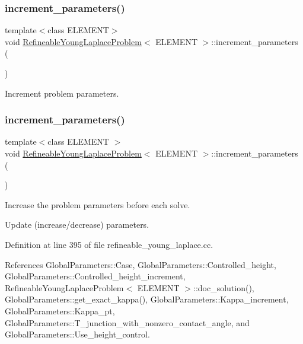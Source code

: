 \subsubsection{\texorpdfstring{increment\+\_\+parameters()}{increment\_parameters()}\hspace{0.1cm}{\footnotesize\ttfamily [1/2]}}
{\footnotesize\ttfamily template$<$class E\+L\+E\+M\+E\+NT$>$ \\
void \hyperlink{classRefineableYoungLaplaceProblem}{Refineable\+Young\+Laplace\+Problem}$<$ E\+L\+E\+M\+E\+NT $>$\+::increment\+\_\+parameters (\begin{DoxyParamCaption}{ }\end{DoxyParamCaption})}



Increment problem parameters. 

\mbox{\label{classRefineableYoungLaplaceProblem_ac8da9e38012994438200b53d398ce465}} 
\subsubsection{\texorpdfstring{increment\+\_\+parameters()}{increment\_parameters()}\hspace{0.1cm}{\footnotesize\ttfamily [2/2]}}
{\footnotesize\ttfamily template$<$class E\+L\+E\+M\+E\+NT $>$ \\
void \hyperlink{classRefineableYoungLaplaceProblem}{Refineable\+Young\+Laplace\+Problem}$<$ E\+L\+E\+M\+E\+NT $>$\+::increment\+\_\+parameters (\begin{DoxyParamCaption}{ }\end{DoxyParamCaption})}



Increase the problem parameters before each solve. 

Update (increase/decrease) parameters. 

Definition at line 395 of file refineable\+\_\+young\+\_\+laplace.\+cc.



References Global\+Parameters\+::\+Case, Global\+Parameters\+::\+Controlled\+\_\+height, Global\+Parameters\+::\+Controlled\+\_\+height\+\_\+increment, Refineable\+Young\+Laplace\+Problem$<$ E\+L\+E\+M\+E\+N\+T $>$\+::doc\+\_\+solution(), Global\+Parameters\+::get\+\_\+exact\+\_\+kappa(), Global\+Parameters\+::\+Kappa\+\_\+increment, Global\+Parameters\+::\+Kappa\+\_\+pt, Global\+Parameters\+::\+T\+\_\+junction\+\_\+with\+\_\+nonzero\+\_\+contact\+\_\+angle, and Global\+Parameters\+::\+Use\+\_\+height\+\_\+control.




